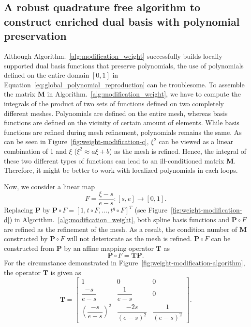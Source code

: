 \subsection{A robust quadrature free algorithm to construct enriched dual basis with polynomial preservation}

Although Algorithm.~\ref{alg:modification_weight} successfully builds locally supported dual basis functions that preserve polynomials, the use of polynomials defined on the entire domain $\left[0, 1 \right]$ in Equation~\eqref{eq:global_polynomial_reproduction} can be troublesome. To assemble the matrix $\mathbf{M}$ in Algorithm.~\ref{alg:modification_weight}, we have to compute the integrals of the product of two sets of functions defined on two completely different meshes. Polynomials are defined on the entire mesh, whereas basis functions are defined on the vicinity of certain amount of elements. While basis functions are refined during mesh refinement, polynomials remains the same. As can be seen in Figure~\ref{fig:weight-modification-c}, $\xi^2$ can be viewed as a linear combination of $1$ and $\xi$ ($\xi^2\approx a\xi+b$) as the mesh is refined. Hence, the integral of these two different types of functions can lead to an ill-conditioned matrix $\mathbf{M}$. Therefore, it might be better to work with localized polynomials in each loops.\par

Now, we consider a linear map
\begin{equation}
	F=\frac{\xi-s}{e-s}\colon  \left[s, e \right]\rightarrow \left[0 , 1\right].
\end{equation}
Replacing $\mathbf{P}$ by $\mathbf{P}\circ F = \left[1, t\circ F, \dots, t^q\circ F\right]^T$ (see Figure~\ref{fig:weight-modification-d}) in Algorithm.~\ref{alg:modification_weight}, both spline basis functions and $\mathbf{P}\circ F$ are refined as the refinement of the mesh. As a result, the condition number of $\mathbf{M}$ constructed by $\mathbf{P}\circ F$ will not deteriorate as the mesh is refined. $\mathbf{P}\circ F$ can be constructed from $\mathbf{P}$ by an affine mapping operator $\mathbf{T}$ as
\begin{equation}
	\mathbf{P}\circ F = \mathbf{T} \mathbf{P}.
\end{equation}
For the circumstance demonstrated in Figure~\ref{fig:weight-modification-algorithm}, the operator $\mathbf{T}$ is given as
\begin{equation}
	\mathbf{T}=
	\begin{bmatrix}
		1                              & 0                    & 0                  \\
		\dfrac{-s}{e-s}                & \dfrac{1}{e-s}       & 0                  \\
		\left(\dfrac{-s}{e-s}\right)^2 & \dfrac{-2s}{(e-s)^2} & \dfrac{1}{(e-s)^2}
	\end{bmatrix}.
\end{equation}

